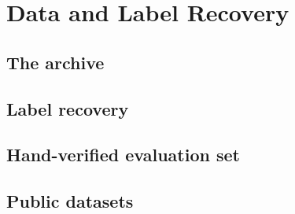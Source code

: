 \chapter{Data and Label Recovery}
\label{ch:data}


\section{The archive}

\section{Label recovery}

\section{Hand-verified evaluation set}

\section{Public datasets}
